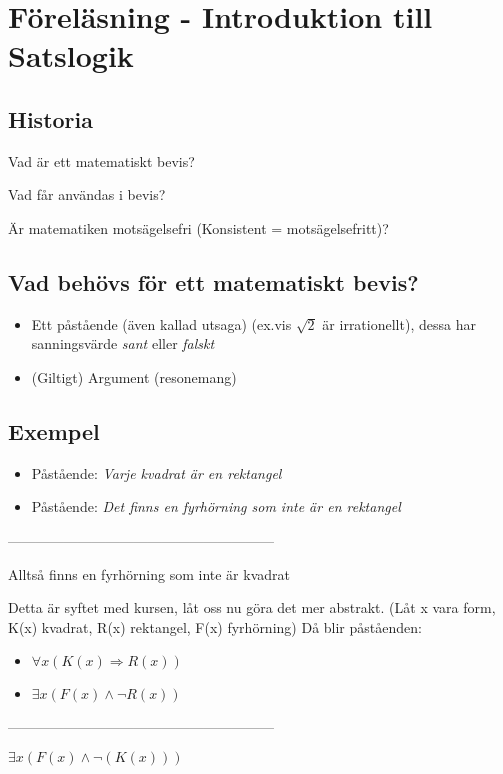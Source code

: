 \section{Föreläsning - Introduktion till Satslogik}

\subsection{Historia}
\par\bigskip

  Vad är ett matematiskt bevis?\par
  Vad får användas i bevis?\par
  Är matematiken motsägelsefri (Konsistent = motsägelsefritt)?

\subsection{Vad behövs för ett matematiskt bevis?}
\par\bigskip

\begin{itemize}
  \item Ett påstående (även kallad utsaga) (ex.vis $\sqrt{2}$ är irrationellt), dessa har sanningsvärde \textit{sant} eller \textit{falskt}
  \item (Giltigt) Argument (resonemang)
\end{itemize}

\subsection{Exempel}

\begin{itemize}
  \item Påstående: \textit{Varje kvadrat är en rektangel}
  \item Påstående: \textit{Det finns en fyrhörning som inte är en rektangel}
\end{itemize}
---------------------------------------------------------

Alltså finns en fyrhörning som inte är kvadrat
\par\bigskip


\noindent Detta är syftet med kursen, låt oss nu göra det mer abstrakt.
(Låt x vara form, K(x) kvadrat, R(x) rektangel, F(x) fyrhörning)
Då blir påståenden:

\begin{itemize}
  \item $\forall x (K(x) \Rightarrow R(x))$
  \item $\exists x (F(x) \wedge \neg R(x))$
\end{itemize}
---------------------------------------------------------\par
$\exists x (F(x) \wedge\neg(K(x)))$

